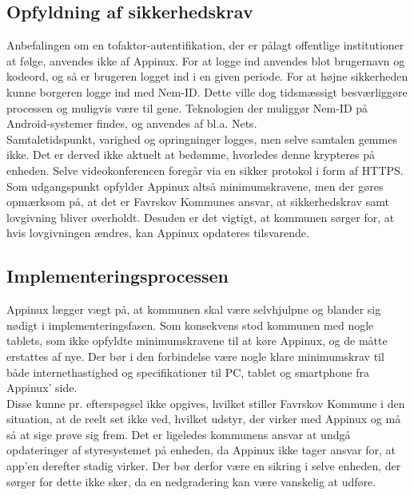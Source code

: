 \subsection{Opfyldning af sikkerhedskrav}
Anbefalingen om en tofaktor-autentifikation, der er pålagt offentlige institutioner at følge, anvendes ikke af Appinux. For at logge ind anvendes blot brugernavn og kodeord, og så er brugeren logget ind i en given periode. For at højne sikkerheden kunne borgeren logge ind med Nem-ID. Dette ville dog tidsmæssigt besværliggøre processen og muligvis være til gene. Teknologien der muliggør Nem-ID på Android-systemer findes, og anvendes af bl.a. Nets\cite{netsapp}.\\
Samtaletidspunkt, varighed og opringninger logges, men selve samtalen gemmes ikke. Det er derved ikke aktuelt at bedømme, hvorledes denne krypteres på enheden. Selve videokonferencen foregår via en sikker protokol i form af HTTPS.\\Som udgangspunkt opfylder Appinux altså minimumskravene, men der gøres opmærksom på, at det er Favrskov Kommunes ansvar, at sikkerhedskrav samt lovgivning bliver overholdt. Desuden er det vigtigt, at kommunen sørger for, at hvis lovgivningen ændres, kan Appinux opdateres tilsvarende.

\subsection{Implementeringsprocessen}
Appinux lægger vægt på, at kommunen skal være selvhjulpne og blander sig nødigt i implementeringsfasen. Som konsekvens stod kommunen med nogle tablets, som ikke opfyldte minimumskravene til at køre Appinux, og de måtte erstattes af nye. Der bør i den forbindelse være nogle klare minimumskrav til både internethastighed og specifikationer til PC, tablet og smartphone fra Appinux' side.\\Disse kunne pr. efterspøgsel ikke opgives, hvilket stiller Favrskov Kommune i den situation, at de reelt set ikke ved, hvilket udstyr, der virker med Appinux og må så at sige prøve sig frem. Det er ligeledes kommunens ansvar at undgå opdateringer af styresystemet på enheden, da Appinux ikke tager ansvar for, at app'en derefter stadig virker. Der bør derfor være en sikring i selve enheden, der sørger for dette ikke sker, da en nedgradering kan være vanskelig at udføre.
